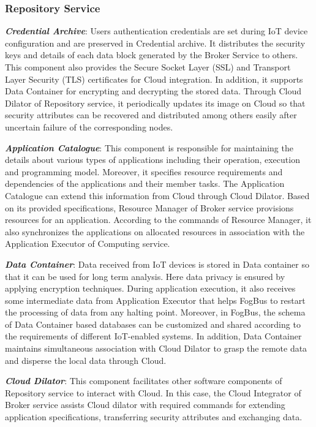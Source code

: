\documentclass[final,5p,times,twocolumn]{elsarticle}
\begin{document}
\subsubsection{Repository Service}
\par \textbf{\textit{Credential Archive}}: Users authentication credentials are set during IoT device configuration and are preserved in Credential archive. It distributes the security keys and details of each data block generated by the Broker Service to others.  This component also provides the Secure Socket Layer (SSL) and Transport Layer Security (TLS) certificates for Cloud integration. In addition, it supports Data Container for encrypting and decrypting the stored data. Through Cloud Dilator of Repository service, it periodically updates its image on Cloud so that security attributes can be recovered and distributed among others easily after uncertain failure of the corresponding nodes. 
%
\par \textbf{\textit{Application Catalogue}}: This component is responsible for maintaining the details about various types of applications including their operation, execution and programming model. Moreover, it specifies resource requirements and dependencies of the applications and their member tasks. The Application Catalogue can extend this information from Cloud through Cloud Dilator. Based on its provided specifications, Resource Manager of Broker service provisions resources for an application. According to the commands of Resource Manager, it also synchronizes the applications on allocated resources in association with the Application Executor of Computing service. 
%
\par \textbf{\textit{Data Container}}: Data received from IoT devices is stored in Data container so that it can be used for long term analysis. Here data privacy is ensured by applying encryption techniques. During application execution, it also receives some intermediate data from Application Executor that helps FogBus to restart the processing of data from any halting point. Moreover, in FogBus, the schema of Data Container based databases can be customized and shared according to the requirements of different IoT-enabled systems. In addition, Data Container maintains simultaneous association with Cloud Dilator to grasp the remote data and disperse the local data through Cloud.
%
\par \textbf{\textit{Cloud Dilator}}: This component facilitates other software components of Repository service to interact with Cloud. In this case, the Cloud Integrator of Broker service assists Cloud dilator with required commands for extending application specifications, transferring security attributes and exchanging data.                 
%
\end{document}
